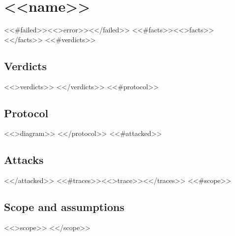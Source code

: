 \section{\texorpdfstring{<<name>>}{<<nameplain>>}}
\label{sec:<<slug>>}
<<#failed>><<>error>><</failed>>
<<#facts>><<>facts>><</facts>>
<<#verdicts>>
\subsection{Verdicts}
<<>verdicts>>
<</verdicts>>
<<#protocol>>
\subsection{Protocol}
<<>diagram>>
<</protocol>>
<<#attacked>>
\subsection{Attacks}
<</attacked>>
<<#traces>><<>trace>><</traces>>
<<#scope>>
\subsection{Scope and assumptions}
<<>scope>>
<</scope>>
